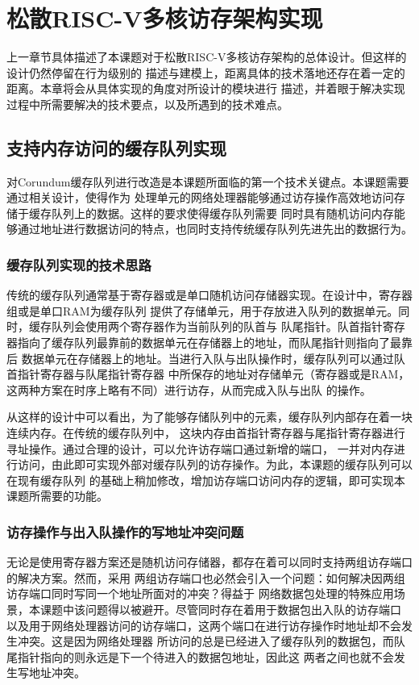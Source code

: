 \section{松散RISC-V多核访存架构实现}

上一章节具体描述了本课题对于松散RISC-V多核访存架构的总体设计。但这样的设计仍然停留在行为级别的
描述与建模上，距离具体的技术落地还存在着一定的距离。本章将会从具体实现的角度对所设计的模块进行
描述，并着眼于解决实现过程中所需要解决的技术要点，以及所遇到的技术难点。

\subsection{支持内存访问的缓存队列实现}

对Corundum缓存队列进行改造是本课题所面临的第一个技术关键点。本课题需要通过相关设计，使得作为
处理单元的网络处理器能够通过访存操作高效地访问存储于缓存队列上的数据。这样的要求使得缓存队列需要
同时具有随机访问内存能够通过地址进行数据访问的特点，也同时支持传统缓存队列先进先出的数据行为。

\subsubsection{缓存队列实现的技术思路}

传统的缓存队列通常基于寄存器或是单口随机访问存储器实现。在设计中，寄存器组或是单口RAM为缓存队列
提供了存储单元，用于存放进入队列的数据单元。同时，缓存队列会使用两个寄存器作为当前队列的队首与
队尾指针。队首指针寄存器指向了缓存队列最靠前的数据单元在存储器上的地址，而队尾指针则指向了最靠后
数据单元在存储器上的地址。当进行入队与出队操作时，缓存队列可以通过队首指针寄存器与队尾指针寄存器
中所保存的地址对存储单元（寄存器或是RAM，这两种方案在时序上略有不同）进行访存，从而完成入队与出队
的操作。

从这样的设计中可以看出，为了能够存储队列中的元素，缓存队列内部存在着一块连续内存。在传统的缓存队列中，
这块内存由首指针寄存器与尾指针寄存器进行寻址操作。通过合理的设计，可以允许访存端口通过新增的端口，
一并对内存进行访问，由此即可实现外部对缓存队列的访存操作。为此，本课题的缓存队列可以在现有缓存队列
的基础上稍加修改，增加访存端口访问内存的逻辑，即可实现本课题所需要的功能。

\subsubsection{访存操作与出入队操作的写地址冲突问题}

无论是使用寄存器方案还是随机访问存储器，都存在着可以同时支持两组访存端口的解决方案。然而，采用
两组访存端口也必然会引入一个问题：如何解决因两组访存端口同时写同一个地址所面对的冲突？得益于
网络数据包处理的特殊应用场景，本课题中该问题得以被避开。尽管同时存在着用于数据包出入队的访存端口
以及用于网络处理器访问的访存端口，这两个端口在进行访存操作时地址却不会发生冲突。这是因为网络处理器
所访问的总是已经进入了缓存队列的数据包，而队尾指针指向的则永远是下一个待进入的数据包地址，因此这
两者之间也就不会发生写地址冲突。

